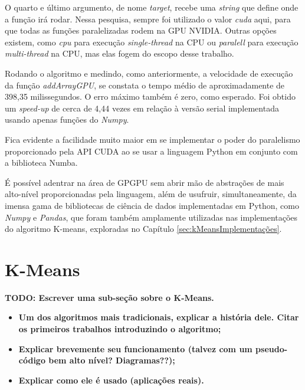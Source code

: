\documentclass[12pt,
openright, 
oneside, %
a4paper,    %
brazil]{facom-ufu-abntex2}
\begin{document}
O quarto e último argumento, de nome \textit{target}, recebe uma \textit{string} que define onde a função irá rodar. Nessa pesquisa, sempre foi utilizado o valor \textit{cuda} aqui, para que todas as funções paralelizadas rodem na GPU NVIDIA. Outras opções existem, como \textit{cpu} para execução \textit{single-thread} na CPU ou \textit{paralell} para execução \textit{multi-thread} na CPU, mas elas fogem do escopo desse trabalho.

% 


Rodando o algoritmo e medindo, como anteriormente, a velocidade de execução da função \textit{addArrayGPU}, se constata o tempo médio de aproximadamente de 398,35 milissegundos. O erro máximo também é zero, como esperado. Foi obtido um \textit{speed-up} de cerca de 4,44 vezes em relação à versão serial implementada usando apenas funções do \textit{Numpy}.

Fica evidente a facilidade muito maior em se implementar o poder do paralelismo proporcionado pela API CUDA ao se usar a linguagem Python em conjunto com a biblioteca Numba.

É possível adentrar na área de GPGPU sem abrir mão de abstrações de mais alto-nível proporcionadas pela linguagem, além de usufruir, simultaneamente, da imensa gama de bibliotecas de ciência de dados implementadas em Python, como \textit{Numpy} e \textit{Pandas}, que foram também amplamente utilizadas nas implementações do algoritmo K-means, exploradas no Capítulo \ref{sec:kMeansImplementações}.




\section{K-Means}
\label{sec:kmeans}


\textbf{TODO: Escrever uma sub-seção sobre o K-Means.}

\begin{itemize}
  \item \textbf{Um dos algoritmos mais tradicionais, explicar a história dele. Citar os primeiros trabalhos introduzindo o algoritmo;}
  \item \textbf{Explicar brevemente seu funcionamento (talvez com um pseudo-código bem alto nível? Diagramas??);}
  \item \textbf{Explicar como ele é usado (aplicações reais).}
\end{itemize}
\end{document}

